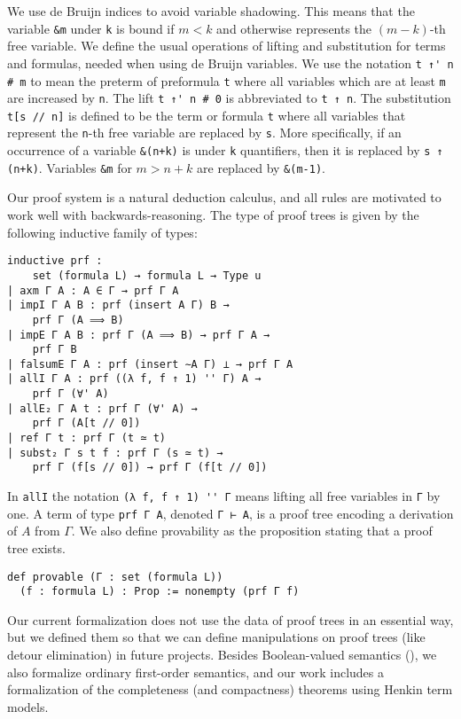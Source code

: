 \documentclass[sigplan,10pt,review, anonymous]{acmart}
\newcommand{\lil}{\lstinline}
\theoremstyle{definition}
\begin{document}
We use de Bruijn indices to avoid variable shadowing. This means that the variable \lil{&m} under \lil{k} is bound if $m<k$ and otherwise represents the $(m-k)$-th free variable.
We define the usual operations of lifting and substitution for terms and formulas, needed when using de Bruijn variables.
We use the notation \lil{t ↑' n # m} to mean the preterm of preformula \lil{t} where all variables which are at least \lil{m} are increased by \lil{n}.
The lift \lil{t ↑' n # 0} is abbreviated to \lil{t ↑ n}.
The substitution \lil{t[s // n]} is defined to be the term or formula \lil{t} where all variables that represent the \lil{n}-th free variable are replaced by \lil{s}.
More specifically, if an occurrence of a variable \lil{&(n+k)} is under \lil{k} quantifiers, then it is replaced by \lil{s ↑ (n+k)}.
Variables \lil{&m} for $m>n+k$ are replaced by \lil{&(m-1)}.

Our proof system is a natural deduction calculus, and all rules are motivated to work well with backwards-reasoning. The type of proof trees is given by the following inductive family of types:
\label{def:prf}
\begin{lstlisting}
inductive prf :
    set (formula L) → formula L → Type u
| axm Γ A : A ∈ Γ → prf Γ A
| impI Γ A B : prf (insert A Γ) B →
    prf Γ (A ⟹ B)
| impE Γ A B : prf Γ (A ⟹ B) → prf Γ A →
    prf Γ B
| falsumE Γ A : prf (insert ∼A Γ) ⊥ → prf Γ A
| allI Γ A : prf ((λ f, f ↑ 1) '' Γ) A →
    prf Γ (∀' A)
| allE₂ Γ A t : prf Γ (∀' A) →
    prf Γ (A[t // 0])
| ref Γ t : prf Γ (t ≃ t)
| subst₂ Γ s t f : prf Γ (s ≃ t) →
    prf Γ (f[s // 0]) → prf Γ (f[t // 0])
\end{lstlisting}
In \lil{allI} the notation \lil{(λ f, f ↑ 1) '' Γ} means lifting all free variables in \lil{Γ} by one.
A term of type \lil{prf Γ A}, denoted \lil{Γ ⊢ A}, is a proof tree encoding a derivation of $A$ from $\Gamma$.
We also define provability as the proposition stating that a proof tree exists.
\begin{lstlisting}
def provable (Γ : set (formula L))
  (f : formula L) : Prop := nonempty (prf Γ f)
\end{lstlisting}
Our current formalization does not use the data of proof trees in an essential way, but we defined them so that we can define manipulations on proof trees (like detour elimination) in future projects.
Besides Boolean-valued semantics (), we also formalize ordinary first-order semantics, and our work includes a formalization of the completeness (and compactness) theorems using Henkin term models.
\end{document}
